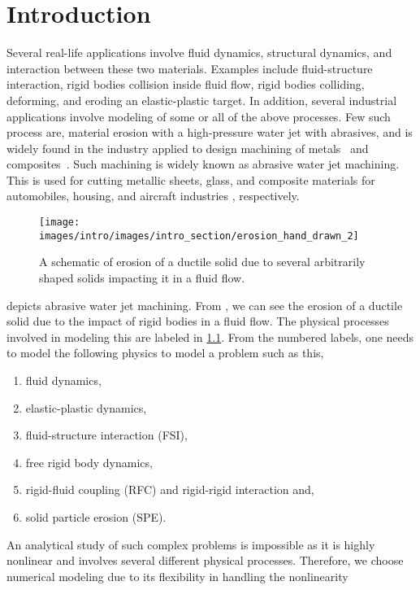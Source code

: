 \chapter{Introduction}
\label{chap:SPH}
Several real-life applications involve fluid dynamics, structural dynamics, and
interaction between these two materials. Examples include fluid-structure
interaction, rigid bodies collision inside fluid flow, rigid bodies colliding,
deforming, and eroding an elastic-plastic target. In addition, several
industrial applications involve modeling of some or all of the above processes.
Few such process are, material erosion with a high-pressure water jet with
abrasives, and is widely found in the industry applied to design machining of
metals~\parencite{llanto_recent_2021} and composites~\parencite{alberdi_composite_2013}.
Such machining is widely known as abrasive water jet machining. This is used for
cutting metallic sheets, glass, and composite materials for automobiles,
housing, and aircraft industries
\parencite{alberdi_composite_2013,aich_abrasive_2014,llanto_recent_2021},
respectively.
\begin{figure}
  \centering
  \texttt{[image: images/intro/images/intro\_section/erosion\_hand\_drawn\_2]}
  \caption{A schematic of erosion of a ductile solid due to several arbitrarily
    shaped solids impacting it in a fluid flow.}
\label{fig:intro-big-picture}
\end{figure}
 depicts abrasive water jet machining. From
, we can see the erosion of a ductile solid due to
the impact of rigid bodies in a fluid flow. The physical processes involved in
modeling this are labeled in \cref{fig:intro-big-picture}. From the numbered
labels, one needs to model the following physics to model a problem such as this,
\begin{enumerate}
\item fluid dynamics,
\item elastic-plastic dynamics,
\item fluid-structure interaction (FSI),
\item free rigid body dynamics,
\item rigid-fluid coupling (RFC) and rigid-rigid interaction and,
\item solid particle erosion (SPE).
\end{enumerate}
An analytical study of such complex problems is impossible as it is highly
nonlinear and involves several different physical processes. Therefore, we
choose numerical modeling due to its flexibility in handling the nonlinearity
